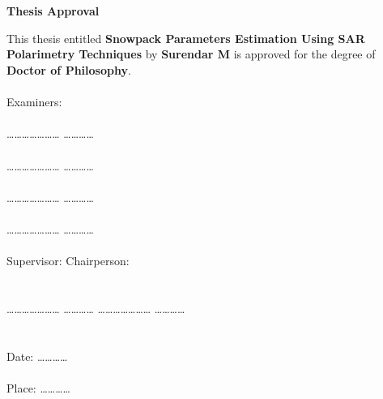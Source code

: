 \chapter*{}
\thispagestyle{empty}
\vspace{-1in}
\begin{center}
{\Large  {\bf Thesis Approval}}
\end{center}
\vspace*{0.1in} \noindent This thesis entitled {\large \bf Snowpack Parameters Estimation Using SAR Polarimetry Techniques} by {\bf \large
Surendar M} is approved for the degree of  {\large \bf Doctor of Philosophy}.\\\\
\hspace*{4 in} Examiners:\\\\
\hspace*{3.5 in} \ldots\ldots \ldots \ldots \ldots \ldots\ldots
\ldots \ldots \ldots\ldots\\\\
\hspace*{3.5 in} \ldots\ldots \ldots \ldots \ldots \ldots\ldots
\ldots \ldots \ldots\ldots\\\\
\hspace*{3.5 in} \ldots\ldots \ldots \ldots \ldots \ldots\ldots
\ldots \ldots \ldots\ldots\\\\
  \hspace*{3.5in} \ldots\ldots \ldots \ldots \ldots \ldots\ldots
\ldots \ldots \ldots\ldots\\\\
 Supervisor:\hspace*{3.5 in}  Chairperson:\\\\\\
\ldots\ldots \ldots \ldots \ldots \ldots\ldots
\ldots \ldots \ldots\ldots
\hspace*{1.0 in} \ldots\ldots \ldots \ldots \ldots \ldots\ldots
\ldots \ldots \ldots\ldots\\\\\\

\noindent
Date: \ldots\ldots \ldots \ldots\\\\
Place: \ldots\ldots \ldots \ldots
